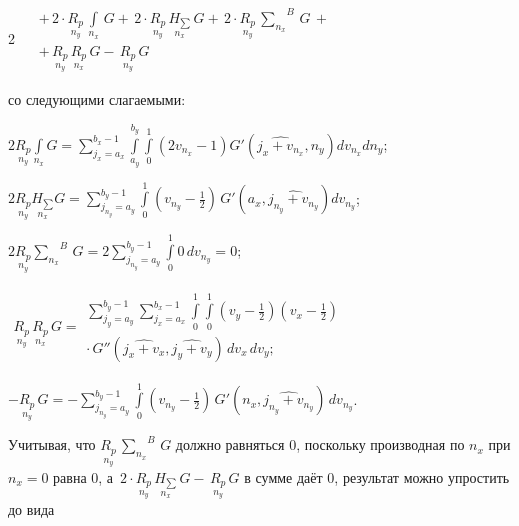 \documentclass[twoside, 10pt]{article}
\begin{document}
\begin{multicols}{2}
    \(\begin{array}{rr}
\, & +\,2\cdot\underset{n_y}{R_{p}}\,\int\limits_{n_x}^{}\,G +\,2\cdot\underset{n_y}{R_{p}}\,\underset{n_x}{H_{\sum}}\,G +\,2\cdot\underset{n_y}{R_{p}}\,{\sum\limits_{n_x}^{}}^{B}\,G\,+ \\
\, & +\,\underset{n_y}{R_{p}}\,\underset{n_x}{R_{p}}\,G -\,\underset{n_y}{R_{p}}\,G
\end{array}\)

    со следующими слагаемыми:

\noindent
\(2 \underset{n_y}{R_{p}}\int\limits_{n_x}^{} G = {\sum\limits_{j_{x}=a_{x}}^{b_{x} - 1} \int\limits_{a_{y}}^{b_{y}} \int\limits_{0}^{1} {\left(2 v_{n_{x}} - 1\right)} G'\left(\widehat{j_{x} + v_{n_{x}}}, n_{y}\right) {d v_{n_{x}}} {d n_{y}}}\);

\noindent
\(2 \underset{n_y}{R_{p}}\underset{n_x}{H_{\sum}} G = {\sum\limits_{j_{n_{y}}=a_{y}}^{b_{y} - 1} \int\limits_{0}^{1}  {\left(v_{n_{y}} - \frac{1}{2}\right)}\,G'\left(a_{x}, \widehat{j_{n_{y}} + v_{n_{y}}}\right) {d v_{n_{y}}}}\);

\(2 \underset{n_y}{R_{p}}{\sum\limits_{n_x}^{}}^{B}\,G = 2 {\sum\limits_{j_{n_{y}}=a_{y}}^{b_{y} - 1} \int\limits_{0}^{1} 0\,{d v_{n_{y}}}} = 0\);


\noindent
$\begin{array}{lr}
\underset{n_y}{R_{p}}\,\underset{n_x}{R_{p}}\,G =
\begin{array}{c}
 \sum\limits_{j_{y}=a_{y}}^{b_{y} - 1} \sum\limits_{j_{x}=a_{x}}^{b_{x} - 1} \int\limits_{0}^{1} \int\limits_{0}^{1} \left(v_{y} - \frac{1}{2}\right)  \left(v_{x} - \frac{1}{2}\right) \\
\cdot \, G''\left(\widehat{j_{x} + v_{x}}, \widehat{j_{y} + v_{y}}\right)\,{d v_{x}}\,{d v_{y}};
\end{array}
\end{array}$

\noindent
\(-\underset{n_y}{R_{p}}\,G = -{\sum\limits_{j_{n_{y}}=a_{y}}^{b_{y} - 1} \int\limits_{0}^{1} {\left(v_{n_{y}} - \frac{1}{2}\right)}\,G'\left(n_{x}, \widehat{j_{n_{y}} + v_{n_{y}}}\right)\,{d v_{n_{y}}}}\).

    Учитывая, что \(\underset{n_y}{R_{p}}\,{\sum\limits_{n_x}^{}}^{B}\,G\)
должно равняться \(0\), поскольку производная по \(n_x\) при \(n_x = 0\) равна \(0\), а
\(\,2\cdot\underset{n_y}{R_{p}}\,\underset{n_x}{H_{\sum}}\,G -\,\underset{n_y}{R_{p}}\,G\)
в сумме даёт \(0\), результат можно упростить до вида

\end{multicols}
\vspace{-3.5mm}
\end{document}
